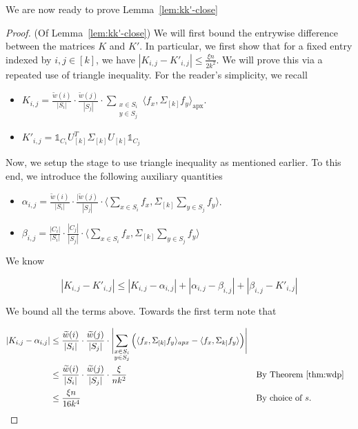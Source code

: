 \documentclass[letterpaper,11pt]{article}
\theoremstyle{plain}
\theoremstyle{definition}
\theoremstyle{remark}
\begin{document}
We are now ready to prove Lemma~\ref{lem:kk'-close}
\begin{proof} (Of Lemma~\ref{lem:kk'-close})
We will first bound the entrywise difference between the matrices $K$ and $K'$. In particular, we first show that for a fixed entry indexed by $i,j \in [k]$, we have $|K_{i,j} - K'_{i,j}| \leq \frac{\xi n}{2k^2}$. We will prove this via a repeated use of triangle inequality. For the reader's simplicity, we recall

\begin{itemize}
    \item $K_{i,j} = \frac{\widetilde w(i)}{|S_i|} \cdot \frac{\widetilde w(j)}{|S_j|} \cdot \sum_{\substack{x \in S_i\\y \in S_j}} \langle f_x, \Sigma_{[k]} f_y\rangle_{\text{apx}}$.
    
    \item $K'_{i,j} = \mathds{1}_{C_i} U_{[k]}^T \Sigma_{[k]} U_{[k]} \mathds{1}_{C_j}$

\end{itemize}

Now, we setup the stage to use triangle inequality as mentioned earlier. To this end, we introduce the following auxiliary quantities

\begin{itemize}
    \item $\alpha_{i,j} = \frac{\widetilde w(i)}{|S_i|} \cdot \frac{|\widetilde w(j)}{|S_j|} \cdot\langle \sum_{x \in S_i} f_x, \Sigma_{[k]} \sum_{y \in S_j} f_y \rangle$.
    \item $\beta_{i,j} = \frac{|C_i|}{|S_i|} \cdot \frac{|C_j|}{|S_j|} \cdot\langle \sum_{x \in S_i} f_x, \Sigma_{[k]} \sum_{y \in S_j} f_y \rangle$
\end{itemize}

We know

\begin{equation} \label{eq:setup-triangle-ineq}
    |K_{i,j} - K'_{i,j}| \leq |K_{i,j} - \alpha_{i,j}| + |\alpha_{i,j} - \beta_{i,j}| + |\beta_{i,j} - K'_{i,j}|
\end{equation}

We bound all the terms above. Towards the first term note that

\begin{align*}
    |K_{i,j} - \alpha_{i,j}| &\leq \frac{\widetilde w(i)}{|S_i|} \cdot \frac{\widetilde w(j)}{|S_j|} \cdot \Biggl|\sum_{\substack{x \in S_i \\ y \in S_j}} \Big(\langle f_x, \Sigma_{[k]} f_y \rangle_{apx} - \langle f_x, \Sigma_{k]} f_y \rangle \Big)\Biggr| \\
    &\leq \frac{\widetilde w(i)}{|S_i|} \cdot \frac{\widetilde w(j)}{|S_j|} \cdot \frac{\xi}{nk^2} &&\text{By Theorem~\ref{thm:wdp}} \\
    &\leq \frac{\xi n}{16 k^4} &&\text{By choice of $s$.}
\end{align*}


\end{proof}
\end{document}
